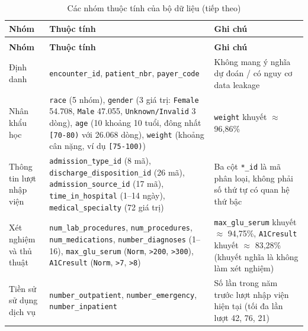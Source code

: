 \documentclass[a4paper]{report}
\begin{document}
{\small{}\renewcommand{}\setlength\tabcolsep{3pt}
\begin{longtable}{|>{\raggedright\arraybackslash}p{118.46pt}|>{\raggedright\arraybackslash}p{158.09pt}|>{\raggedright\arraybackslash}p{158.09pt}|}
\caption{Các nhóm thuộc tính của bộ dữ liệu}\label{tb:nhom}\\
\hline
\textbf{Nhóm} & \textbf{Thuộc tính} & \textbf{Ghi chú} \\ \hline\endfirsthead
\caption[]{Các nhóm thuộc tính của bộ dữ liệu (tiếp theo)}\\
\hline
\textbf{Nhóm} & \textbf{Thuộc tính} & \textbf{Ghi chú} \\ \hline\endhead
Định danh & \texttt{encounter\_\allowbreak{}id}, \texttt{patient\_\allowbreak{}nbr}, \texttt{payer\_\allowbreak{}code} & Không mang ý nghĩa dự đoán / có nguy cơ data leakage \\ \hline
Nhân khẩu học & \texttt{race} (5 nhóm), \texttt{gender} (3 giá trị: \texttt{Female} 54.708, \texttt{Male} 47.055, \texttt{Unknown/\allowbreak{}Invalid} 3 dòng), \texttt{age} (10 khoảng 10 tuổi, đông nhất \texttt{[70-80)} với 26.068 dòng), \texttt{weight} (khoảng cân nặng, ví dụ \texttt{[75-100)}) & \texttt{weight} khuyết $\approx$ 96,86\% \\ \hline
Thông tin lượt nhập viện & \texttt{admission\_\allowbreak{}type\_\allowbreak{}id} (8 mã), \texttt{discharge\_\allowbreak{}disposition\_\allowbreak{}id} (26 mã), \texttt{admission\_\allowbreak{}source\_\allowbreak{}id} (17 mã), \texttt{time\_\allowbreak{}in\_\allowbreak{}hospital} (1–14 ngày), \texttt{medical\_\allowbreak{}specialty} (72 giá trị) & Ba cột \texttt{*\_\allowbreak{}id} là mã phân loại, không phải số thứ tự có quan hệ thứ bậc \\ \hline
Xét nghiệm và thủ thuật & \texttt{num\_\allowbreak{}lab\_\allowbreak{}procedures}, \texttt{num\_\allowbreak{}procedures}, \texttt{num\_\allowbreak{}medications}, \texttt{number\_\allowbreak{}diagnoses} (1–16), \texttt{max\_\allowbreak{}glu\_\allowbreak{}serum} (\texttt{Norm}, \texttt{>200}, \texttt{>300}), \texttt{A1Cresult} (\texttt{Norm}, \texttt{>7}, \texttt{>8}) & \texttt{max\_\allowbreak{}glu\_\allowbreak{}serum} khuyết $\approx$ 94,75\%, \texttt{A1Cresult} khuyết $\approx$ 83,28\% (khuyết nghĩa là không làm xét nghiệm) \\ \hline
Tiền sử sử dụng dịch vụ & \texttt{number\_\allowbreak{}outpatient}, \texttt{number\_\allowbreak{}emergency}, \texttt{number\_\allowbreak{}inpatient} & Số lần trong năm trước lượt nhập viện hiện tại (tối đa lần lượt 42, 76, 21) \\ \hline

\end{longtable}}
\end{document}

